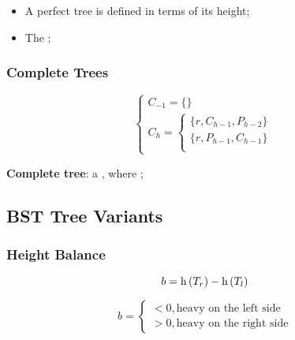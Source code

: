     \begin{itemize}
      \item A perfect tree is defined in terms of its height;
      \item The ;
    \end{itemize}

  \subsubsection{Complete Trees}

    \begin{equation}
      \begin{cases}
        C_{-1} = \{ \} \\ 
        C_{h} = 
        \begin{cases}
          \{r, C_{h - 1}, P_{h - 2} \} \\ 
          \{r, P_{h - 1}, C_{h - 1} \} \\ 
        \end{cases}
      \end{cases}
    \end{equation}
    
    \begin{definition}
      \textbf{Complete tree}: a , where ;
    \end{definition}
  
\subsection{BST Tree Variants}

  \subsubsection{Height Balance}

    \begin{equation}
      b = \operatorname{h} \left( T_{r} \right) - \operatorname{h} \left( T_{l} \right)
    \end{equation}
    
    \begin{equation}
      b = 
      \begin{cases}
        < 0, \text{heavy on the left side} \\ 
        > 0, \text{heavy on the right side}
      \end{cases}
    \end{equation}
    
